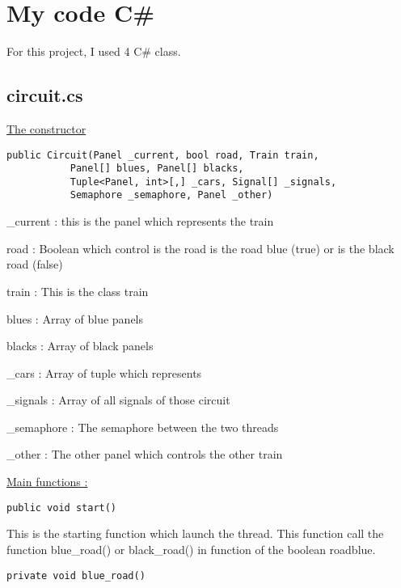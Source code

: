 \documentclass[12pt]{article}
\begin{document}
\newpage

\section{My code C\#}

For this project, I used 4 C\# class.

\subsection{circuit.cs}

\underline{The constructor}

\begin{lstlisting}[frame=single]
public Circuit(Panel _current, bool road, Train train, 
		   Panel[] blues, Panel[] blacks, 
		   Tuple<Panel, int>[,] _cars, Signal[] _signals,
		   Semaphore _semaphore, Panel _other)

\end{lstlisting}

\quad


\_current   : this is the panel which represents the train

road 	    : Boolean which control is the road is the road blue (true) or is the black road (false)

train	    : This is the class train

blues	    : Array of blue panels

blacks	    : Array of black panels

\_cars	    : Array of tuple which represents

\_signals   : Array of all signals of those circuit

\_semaphore : The semaphore between the two threads 

\_other	    : The other panel which controls the other train

\quad

\underline{Main functions :}

\quad

\begin{lstlisting}[frame=single]
public void start()
\end{lstlisting}

This is the starting function which launch the thread. This function call the function blue\_road() or black\_road() in function of the boolean roadblue. \\  

\begin{lstlisting}[frame=single]
private void blue_road()
\end{lstlisting}
\end{document}
